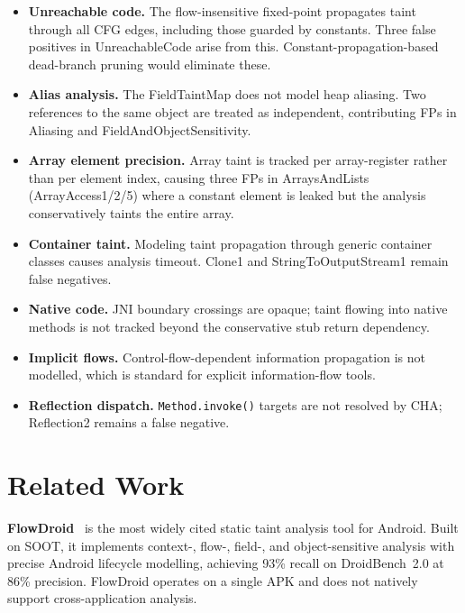 \documentclass[conference]{IEEEtran}
\begin{document}
\begin{itemize}

\item \textbf{Unreachable code.} The flow-insensitive fixed-point propagates
taint through all CFG edges, including those guarded by constants. Three false
positives in UnreachableCode arise from this. Constant-propagation-based
dead-branch pruning would eliminate these.

\item \textbf{Alias analysis.} The FieldTaintMap does not model heap aliasing.
Two references to the same object are treated as independent, contributing FPs in
Aliasing and FieldAndObjectSensitivity.

\item \textbf{Array element precision.} Array taint is tracked per array-register
rather than per element index, causing three FPs in ArraysAndLists
(ArrayAccess1/2/5) where a constant element is leaked but the analysis
conservatively taints the entire array.

\item \textbf{Container taint.} Modeling taint propagation through generic
container classes causes analysis timeout. Clone1 and StringToOutputStream1
remain false negatives.

\item \textbf{Native code.} JNI boundary crossings are opaque; taint flowing
into native methods is not tracked beyond the conservative stub return dependency.

\item \textbf{Implicit flows.} Control-flow-dependent information propagation is
not modelled, which is standard for explicit information-flow tools.

\item \textbf{Reflection dispatch.} \texttt{Method.invoke()} targets are not
resolved by CHA; Reflection2 remains a false negative.

\end{itemize}

\section{Related Work}

\textbf{FlowDroid}~\cite{flowdroid} is the most widely cited static taint
analysis tool for Android. Built on SOOT, it implements context-, flow-, field-,
and object-sensitive analysis with precise Android lifecycle modelling, achieving
93\% recall on DroidBench~2.0 at 86\% precision. FlowDroid operates on a single
APK and does not natively support cross-application analysis.
\end{document}
